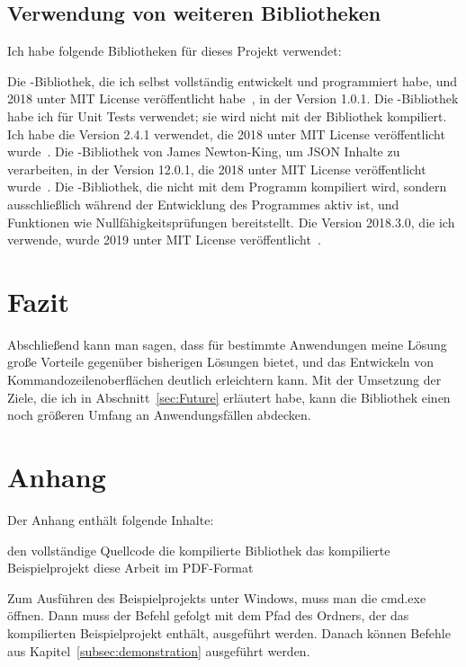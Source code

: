 \documentclass[a4paper,11pt,titlepage,ngerman]{article}
\newcommand{\inlinecode}[1]{{\color{green}{\lstinline[language=]$#1$}}}
\begin{document}
\begin{sloppypar}
  \subsection{Verwendung von weiteren Bibliotheken}\label{subsec:UsageOfLibraries}
  Ich habe folgende Bibliotheken für dieses Projekt verwendet:
  \begin{outline}
   \1 Die \inlinecode{PropertyOrFieldInfo}-Bibliothek, die ich selbst vollständig entwickelt und programmiert habe,
   und 2018 unter MIT License veröffentlicht habe~\cite{PropOrFieldSite}, in der Version 1.0.1.
   \1 Die \inlinecode{xunit}-Bibliothek habe ich für Unit Tests verwendet; sie wird nicht mit der Bibliothek kompiliert.
   Ich habe die Version 2.4.1 verwendet, die 2018 unter MIT License veröffentlicht wurde~\cite{XunitReleaseNotes}.
   \1 Die \inlinecode{Newtonsoft.Json}-Bibliothek von James Newton-King, um JSON Inhalte zu verarbeiten, in der Version 12.0.1,
   die 2018 unter MIT License veröffentlicht wurde~\cite{JsonNetSite}.
   \1 Die \inlinecode{Jetbrains.Annotations}-Bibliothek, die nicht mit dem Programm kompiliert wird,
   sondern ausschließlich während der Entwicklung des Programmes aktiv ist, und Funktionen wie Nullfähigkeitsprüfungen bereitstellt.
   Die Version 2018.3.0, die ich verwende, wurde 2019 unter MIT License veröffentlicht~\cite{AnnotationsNuget}.
  \end{outline}
  \section{Fazit}\label{sec:Conclusion}
Abschließend kann man sagen, dass für bestimmte Anwendungen meine Lösung große Vorteile gegenüber bisherigen Lösungen bietet, 
  und das Entwickeln von Kommandozeilenoberflächen deutlich erleichtern kann.
Mit der Umsetzung der Ziele, die ich in Abschnitt~\ref{sec:Future} erläutert habe, kann die Bibliothek einen noch größeren Umfang an Anwendungsfällen abdecken. 
  \newpage
  \section{Anhang}\label{sec:Attachments}
  Der Anhang enthält folgende Inhalte:
  \begin{outline}
   \1 den vollständige Quellcode
   \1 die kompilierte Bibliothek
   \1 das kompilierte Beispielprojekt
   \1 diese Arbeit im PDF-Format
     \end{outline}
  Zum Ausführen des Beispielprojekts unter Windows, muss man die cmd.exe öffnen.
  Dann muss der Befehl \inlinecode{cd /d} gefolgt mit dem Pfad des Ordners, der das kompilierten Beispielprojekt enthält, ausgeführt werden.
  Danach können Befehle aus Kapitel~\ref{subsec:demonstration} ausgeführt werden.
  

\end{sloppypar}
\end{document}
